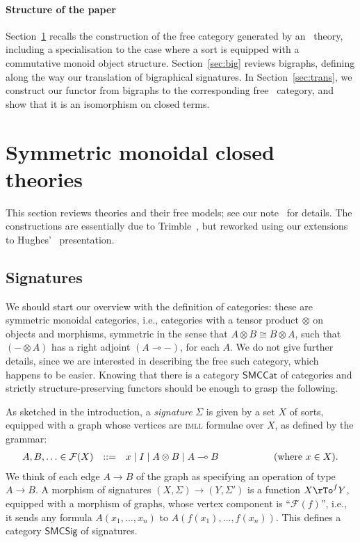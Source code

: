 \documentclass{llncs}
\newcommand{\bigcat}[1]{\mathsf{#1}}
\newcommand{\Formulae}{\mathcal{F}}
\newcommand{\Sig}{\bigcat{SMCSig}} \newcommand{\Set}{\bigcat{Set}}
\newcommand{\SMCCat}{\bigcat{SMCCat}}
\newcommand{\imll}{\textsc{imll}}
\newcommand{\iso}{\cong}
\newcommand{\impll}{\multimap}
\newcommand{\tens}{\otimes}
\newcommand{\alt}{\mathrel{|}}
\begin{document}
\paragraph{Structure of the paper}
Section~\ref{sec:smctheories} recalls the construction of the free
\smc{} category generated by an \smc\ theory, including a
specialisation to the case where a sort is equipped with a commutative
monoid object structure.  Section~\ref{sec:big} reviews bigraphs,
defining along the way our translation of bigraphical signatures. In
Section~\ref{sec:trans}, we construct our functor from bigraphs to the
corresponding free \smc\ category, and show that it is an isomorphism
on closed terms.


\section{Symmetric monoidal closed theories}\label{sec:smctheories}
This section reviews \smc{} theories and their free models; see our
note~\cite{GHP} for details. The constructions are essentially due to
Trimble~\cite{Trimble:phd}, but reworked using our extensions to
Hughes'~\cite{Hughes:freestar} presentation.

\subsection{Signatures}
We should start our overview with the definition of \smc{} categories:
these are symmetric monoidal categories, i.e., categories with a
tensor product $\tens$ on objects and morphisms, symmetric in the
sense that $A \tens B \iso B \tens A$, such that $(- \tens A)$ has a
right adjoint $(A \impll -)$, for each $A$. We do not give further
details, since we are interested in describing the free such category,
which happens to be easier. Knowing that there is a category $\SMCCat$
of \smc{} categories and strictly structure-preserving functors should
be enough to grasp the following.

As sketched in the introduction, a \emph{signature} $\Sigma$ is given
by a set $X$ of sorts, equipped with a graph whose vertices are
\imll{} formulae over $X$, as defined by the grammar:
$$\begin{array}{rcl@{\hspace*{2cm}}r}
  A, B, \ldots \in \Formulae (X) & ::= & x \alt I \alt A \tens B \alt A \impll B & 
  \mbox{(where $x \in X$).}
\end{array}$$
We think of each edge $A \to B$ of the graph as specifying an operation 
of type $A \to B$.
A morphism of signatures $(X, \Sigma) \to (Y, \Sigma')$ is a 
function $X \rTo^{f} Y$, equipped with a morphism of graphs, whose 
vertex component is ``$\Formulae (f)$'', i.e., it sends 
any formula $A (x_1, \ldots, x_n)$ to $A (f (x_1), \ldots, f (x_n))$.
This defines a category $\Sig$ of signatures.
\end{document}
